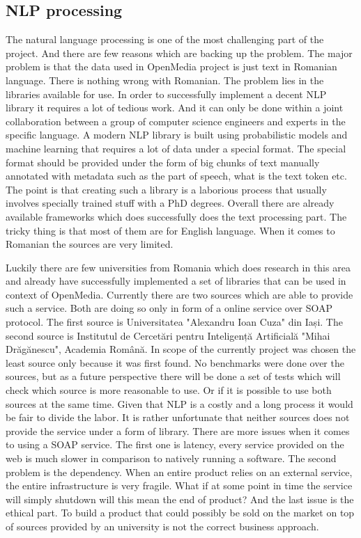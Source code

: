 


\subsection{NLP processing}
The natural language processing is one of the most challenging part of the project. And there are few reasons which are backing up the problem. The major problem is that the data used in OpenMedia project is just text in Romanian language. There is nothing wrong with Romanian. The problem lies in the libraries available for use. In order to successfully implement a decent NLP library it requires a lot of tedious work. And it can only be done within a joint collaboration between a group of computer science engineers and experts in the specific language. A modern NLP library is built using probabilistic models and machine learning that requires a lot of data under a special format. The special format should be provided under the form of big chunks of text manually annotated with metadata such as the part of speech, what is the text token etc. The point is that creating such a library is a laborious process that usually involves specially trained stuff with a PhD degrees. Overall there are already available frameworks which does successfully does the text processing part. The tricky thing is that most of them are for English language. When it comes to Romanian the sources are very limited.

Luckily there are few universities from Romania which does research in this area and already have successfully implemented a set of libraries that can be used in context of OpenMedia. Currently there are two sources which are able to provide such a service. Both are doing so only in form of a online service over SOAP protocol. The first source is Universitatea "Alexandru Ioan Cuza" din Iași\cite{uaic}. The second source is Institutul de Cercetări pentru Inteligență Artificială "Mihai Drăgănescu", Academia Română\cite{racai}. In scope of the currently project was chosen the least source only because it was first found. No benchmarks were done over the sources, but as a future perspective there will be done a set of tests which will check which source is more reasonable to use. Or if it is possible to use both sources at the same time. Given that NLP is a costly and a long process it would be fair to divide the labor. It is rather unfortunate that neither sources does not provide the service under a form of library. There are more issues when it comes to using a SOAP service. The first one is latency, every service provided on the web is much slower in comparison to natively running a software. The second problem is the dependency. When an entire product relies on an external service, the entire infrastructure is very fragile. What if at some point in time the service will simply shutdown will this mean the end of product? And the last issue is the ethical part. To build a product that could possibly be sold on the market on top of sources provided by an university is not the correct business approach.

